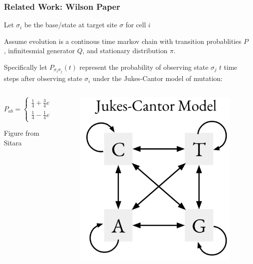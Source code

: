 \documentclass[
	11pt, %
]{beamer}
\begin{document}
\begin{frame}
	\frametitle{Related Work: Wilson Paper}

	Let $\sigma_i$ be the base/state at target site $\sigma$ for cell $i$
	\bigskip

	Assume evolution is a continous time markov chain with transition probablities $P$, infinitesmial generator $Q$, and stationary distribution $\pi$.
	\bigskip
	
	Specifically let $P_{\sigma_i \sigma_j}(t)$ represent the probability of observing state $\sigma_j$ $t$ time steps after observing state $\sigma_i$ under the Jukes-Cantor model of mutation:

	\begin{columns}[t]
		\begin{column}{0.70\textwidth}
			\begin{equation*}
				P_{ab} = 
					\begin{cases}
						\frac{1}{4} + \frac{3}{4} e^{-4t/3} := P_{\textrm{diag}} & \textrm{if } a=b \\
						\frac{1}{4} - \frac{1}{4} e^{-4t/3} := P_{\setminus \textrm{diag}} & \textrm{otherwise}
					\end{cases}
			\end{equation*}

			\bigskip
			Figure from Sitara
		\end{column}

		\begin{column}{0.30\textwidth}
			\begin{figure}
				\includegraphics[width=0.8\linewidth]{jukes-cantor.png}
			\end{figure}
		\end{column}
	\end{columns}
\end{frame}
\end{document}
